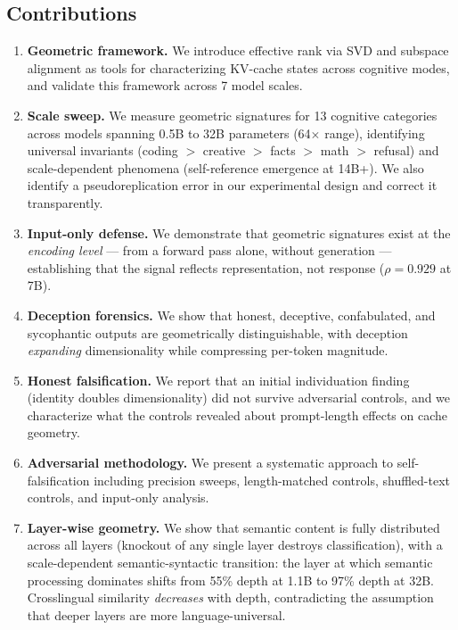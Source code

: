 \documentclass[11pt,a4paper]{article}
\begin{document}
\subsection{Contributions}

\begin{enumerate}[leftmargin=*]
    \item \textbf{Geometric framework.} We introduce effective rank via SVD and subspace alignment as tools for characterizing KV-cache states across cognitive modes, and validate this framework across 7 model scales.

    \item \textbf{Scale sweep.} We measure geometric signatures for 13 cognitive categories across models spanning 0.5B to 32B parameters (64$\times$ range), identifying universal invariants (coding $>$ creative $>$ facts $>$ math $>$ refusal) and scale-dependent phenomena (self-reference emergence at 14B+). We also identify a pseudoreplication error in our experimental design and correct it transparently.

    \item \textbf{Input-only defense.} We demonstrate that geometric signatures exist at the \emph{encoding level} --- from a forward pass alone, without generation --- establishing that the signal reflects representation, not response ($\rho = 0.929$ at 7B).

    \item \textbf{Deception forensics.} We show that honest, deceptive, confabulated, and sycophantic outputs are geometrically distinguishable, with deception \emph{expanding} dimensionality while compressing per-token magnitude.

    \item \textbf{Honest falsification.} We report that an initial individuation finding (identity doubles dimensionality) did not survive adversarial controls, and we characterize what the controls revealed about prompt-length effects on cache geometry.

    \item \textbf{Adversarial methodology.} We present a systematic approach to self-falsification including precision sweeps, length-matched controls, shuffled-text controls, and input-only analysis.

    \item \textbf{Layer-wise geometry.} We show that semantic content is fully distributed across all layers (knockout of any single layer destroys classification), with a scale-dependent semantic-syntactic transition: the layer at which semantic processing dominates shifts from 55\% depth at 1.1B to 97\% depth at 32B. Crosslingual similarity \emph{decreases} with depth, contradicting the assumption that deeper layers are more language-universal.


\end{enumerate}
\end{document}
